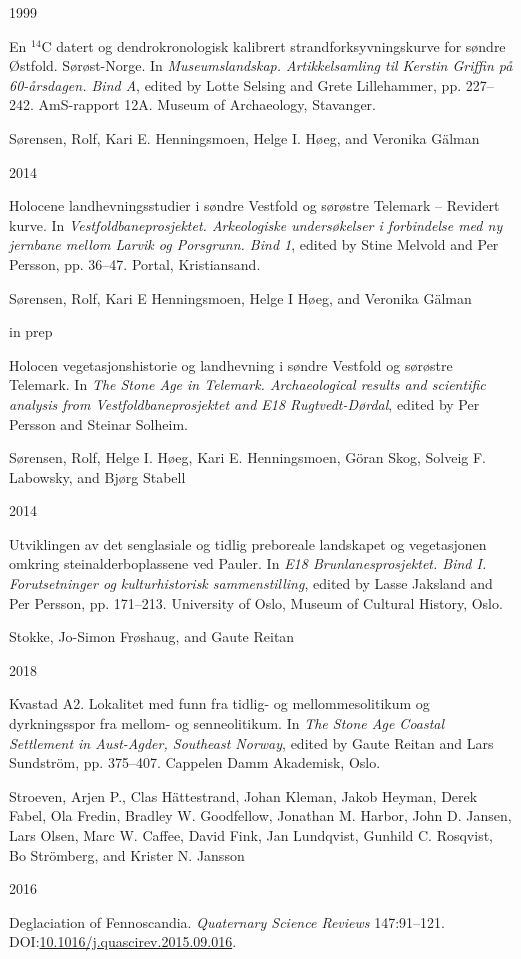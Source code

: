 \documentclass[
]{article}
\newlength{\cslhangindent}
\newlength{\csllabelwidth}
\newlength{\cslentryspacingunit} %
\newenvironment{CSLReferences}[2] %
 {%
  \setlength{\parindent}{0pt}
  \ifodd #1
  \let\oldpar\par
  \def\par{\hangindent=\cslhangindent\oldpar}
  \fi
  \setlength{\parskip}{#2\cslentryspacingunit}
 }%
 {}
\newcommand{\CSLBlock}[1]{#1\hfill\break}
\newcommand{\CSLLeftMargin}[1]{\parbox[t]{\csllabelwidth}{#1}}
\newcommand{\CSLRightInline}[1]{\parbox[t]{\linewidth - \csllabelwidth}{#1}\break}
\begin{document}
\begin{CSLReferences}{0}{0}
\leavevmode{}%
\CSLLeftMargin{ 1999 }
\CSLRightInline{{En \(^{14}\)C datert og dendrokronologisk kalibrert strandforksyvningskurve for søndre Østfold. Sørøst-Norge}. In \emph{{Museumslandskap. Artikkelsamling til Kerstin Griffin på 60-årsdagen. Bind A}}, edited by Lotte Selsing and Grete Lillehammer, pp. 227--242. AmS-rapport 12A. Museum of Archaeology, Stavanger.}

\leavevmode{}%
\CSLBlock{Sørensen, Rolf, Kari E. Henningsmoen, Helge I. Høeg, and Veronika Gälman}
\CSLLeftMargin{ 2014}
\CSLRightInline{{Holocene landhevningsstudier i søndre Vestfold og sørøstre Telemark -- Revidert kurve}. In \emph{{Vestfoldbaneprosjektet. Arkeologiske undersøkelser i forbindelse med ny jernbane mellom Larvik og Porsgrunn. Bind 1}}, edited by Stine Melvold and Per Persson, pp. 36--47. Portal, Kristiansand.}

\leavevmode{}%
\CSLBlock{Sørensen, Rolf, Kari E Henningsmoen, Helge I Høeg, and Veronika Gälman}
\CSLLeftMargin{ in prep}
\CSLRightInline{{Holocen vegetasjonshistorie og landhevning i søndre Vestfold og sørøstre Telemark}. In \emph{{The Stone Age in Telemark. Archaeological results and scientific analysis from Vestfoldbaneprosjektet and E18 Rugtvedt-Dørdal}}, edited by Per Persson and Steinar Solheim.}

\leavevmode{}%
\CSLBlock{Sørensen, Rolf, Helge I. Høeg, Kari E. Henningsmoen, Göran Skog, Solveig F. Labowsky, and Bjørg Stabell}
\CSLLeftMargin{ 2014}
\CSLRightInline{{Utviklingen av det senglasiale og tidlig preboreale landskapet og vegetasjonen omkring steinalderboplassene ved Pauler}. In \emph{{E18 Brunlanesprosjektet. Bind I. Forutsetninger og kulturhistorisk sammenstilling}}, edited by Lasse Jaksland and Per Persson, pp. 171--213. University of Oslo, Museum of Cultural History, Oslo.}

\leavevmode{}%
\CSLBlock{Stokke, Jo-Simon Frøshaug, and Gaute Reitan}
\CSLLeftMargin{ 2018}
\CSLRightInline{Kvastad A2. Lokalitet med funn fra tidlig- og mellommesolitikum og dyrkningsspor fra mellom- og senneolitikum. In \emph{{The Stone Age Coastal Settlement in Aust-Agder, Southeast Norway}}, edited by Gaute Reitan and Lars Sundström, pp. 375--407. Cappelen Damm Akademisk, Oslo.}

\leavevmode{}%
\CSLBlock{Stroeven, Arjen P., Clas Hättestrand, Johan Kleman, Jakob Heyman, Derek Fabel, Ola Fredin, Bradley W. Goodfellow, Jonathan M. Harbor, John D. Jansen, Lars Olsen, Marc W. Caffee, David Fink, Jan Lundqvist, Gunhild C. Rosqvist, Bo Strömberg, and Krister N. Jansson}
\CSLLeftMargin{ 2016}
\CSLRightInline{Deglaciation of Fennoscandia. \emph{Quaternary Science Reviews} 147:91--121. DOI:\href{https://doi.org/10.1016/j.quascirev.2015.09.016}{10.1016/j.quascirev.2015.09.016}.}


\end{CSLReferences}
\end{document}
